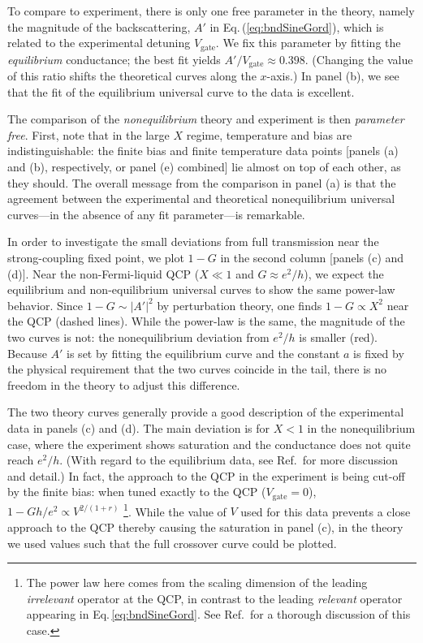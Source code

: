 \documentclass[aps,prb,reprint,floatfix,superscriptaddress,amssymb,amsmath]{revtex4-2}
\newcommand{\Vg}{V_\text{gate}}
\begin{document}
To compare to experiment, there is only one free parameter in the theory, namely the magnitude of the backscattering, $A'$ in Eq.\,(\ref{eq:bndSineGord}), which is related to the experimental detuning $\Vg$. We fix this parameter by fitting the \emph{equilibrium} conductance; the best fit yields $A'/\Vg\!\approx\! 0.398$. (Changing the value of this ratio shifts the theoretical curves along the $x$-axis.) In panel (b), we see that the fit of the equilibrium universal curve to the data is excellent. 

The comparison of the \emph{nonequilibrium} theory and experiment is then \emph{parameter free}. 
First, note that in the large $X$ regime, temperature and bias are indistinguishable: the finite bias and finite temperature data points [panels (a) and (b), respectively, or panel (e) combined] lie almost on top of each other, as they should. 
The overall message from the comparison in panel (a) is that the agreement between the experimental and theoretical nonequilibrium universal curves---in the absence of any fit parameter---is remarkable. 

In order to investigate the small deviations from full transmission near the strong-coupling fixed point, we plot $1\!-\!G$ in the second column [panels (c) and (d)]. 
Near the non-Fermi-liquid QCP ($X\!\ll\!1$ and $G\!\approx\! e^2/h$), we expect the equilibrium and non-equilibrium universal curves to show the same power-law behavior. 
Since $1\!-\!G \!\sim\! |A'|^2$ by perturbation theory, one finds $1\!-\!G \!\propto\! X^2$ near the QCP (dashed lines). While the power-law is the same, the magnitude of the two curves is not: the nonequilibrium deviation from $e^2/h$ is smaller (red). Because $A'$ is set by fitting the equilibrium curve and the constant $a$ is fixed by the physical requirement that the two curves coincide in the tail, there is no freedom in the theory to adjust this difference. 

The two theory curves generally provide a good description of the experimental data in panels (c) and (d). The main deviation is for $X\!<\!1$ in the nonequilibrium case, where the experiment shows saturation and the conductance does not quite reach $e^2/h$. (With regard to the equilibrium data, see Ref.\,\cite{Mebrahtu13} for more discussion and detail.) In fact, the approach to the QCP in the experiment is being cut-off by the finite bias: when tuned exactly to the QCP ($\Vg\!=\!0$), $1 - Gh/e^2 \propto V^{2/(1+r)}$ 
\footnote{The power law here comes from the scaling dimension of the leading \emph{irrelevant} operator at the QCP, in contrast to the leading \emph{relevant} operator appearing in Eq.\,\ref{eq:bndSineGord}. See Ref.\,\cite{ZhangNoneqPRR21} for a thorough discussion of this case.}. 
While the value of $V$ used for this data prevents a close approach to the QCP thereby causing the saturation in panel (c), in the theory we used values such that the full crossover curve could be  plotted. 
\end{document}
